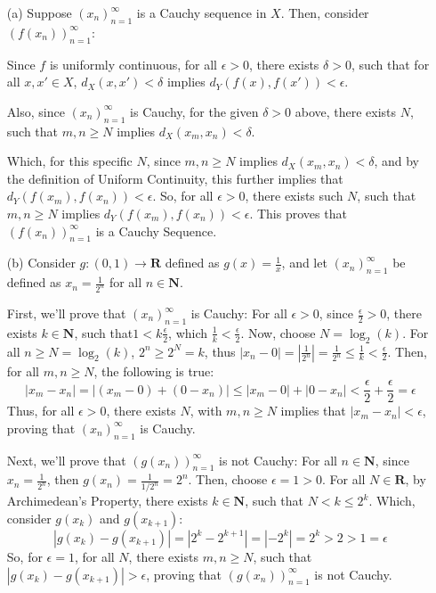 \documentclass{article}
\begin{document}
\begin{itemize}
    \item[(a)] Suppose $(x_n)_{n=1}^{\infty}$ is a Cauchy sequence in $X$. Then, consider $\left(f(x_n)\right)_{n=1}^{\infty}$: 
    
    Since $f$ is uniformly continuous, for all $\epsilon > 0$, there exists $\delta > 0$, such that for all $x,x' \in X$, $d_X(x,x') < \delta$ implies $d_Y(f(x),f(x')) < \epsilon$.

    Also, since $(x_n)_{n=1}^{\infty}$ is Cauchy, for the given $\delta > 0$ above, there exists $N$, such that $m,n \geq N$ implies $d_X(x_m, x_n) < \delta$.

    Which, for this specific $N$, since $m,n \geq N$ implies $d_X(x_m, x_n) < \delta$, and by the definition of Uniform Continuity, this further implies that $d_Y(f(x_m), f(x_n)) < \epsilon$. So, for all $\epsilon >0$, there exists such $N$, such that $m,n \geq N$ implies $d_Y(f(x_m), f(x_n)) < \epsilon$. This proves that $(f(x_n))_{n=1}^{\infty}$ is a Cauchy Sequence.

    \hfill

    \item[(b)] Consider $g:(0,1) \rightarrow \mathbf{R}$ defined as $g(x) = \frac{1}{x}$, and let $(x_n)_{n=1}^{\infty}$ be defined as $x_n = \frac{1}{2^n}$ for all $n \in \mathbf{N}$.

    First, we'll prove that $(x_n)_{n=1}^{\infty}$ is Cauchy: For all $\epsilon > 0$, since $\frac{\epsilon}{2} > 0$, there exists $k \in \mathbf{N}$, such that$ 1 < k\frac{\epsilon}{2}$, which $\frac{1}{k} < \frac{\epsilon}{2}$. Now, choose $N = \log_{2}(k)$. For all $n \geq N = \log_2(k)$, $2^n \geq 2^N = k$, thus $|x_n-0| = |\frac{1}{2^n}| = \frac{1}{2^n} \leq \frac{1}{k} < \frac{\epsilon}{2}$. Then, for all $m,n \geq N$, the following is true:
    $$|x_m-x_n| = |(x_m-0) + (0-x_n)| \leq |x_m-0| + |0-x_n| < \frac{\epsilon}{2} + \frac{\epsilon}{2} = \epsilon$$
    Thus, for all $\epsilon >0$, there exists $N$, with $m,n \geq N$ implies that $|x_m-x_n| < \epsilon$, proving that $(x_n)_{n=1}^{\infty}$ is Cauchy.

    Next, we'll prove that $(g(x_n))_{n=1}^{\infty}$ is not Cauchy: For all $n \in \mathbf{N}$, since $x_n = \frac{1}{2^n}$, then $g(x_n) = \frac{1}{1/2^n} = 2^n$. Then, choose $\epsilon = 1 > 0$. For all $N \in \mathbf{R}$, by Archimedean's Property, there exists $k\in\mathbf{N}$, such that $N<k \leq 2^k$. Which, consider $g(x_k)$ and $g(x_{k+1})$: 
    $$|g(x_k)-g(x_{k+1})| = |2^k-2^{k+1}| = |-2^k| = 2^k > 2 > 1 = \epsilon$$
    So, for $\epsilon =1$, for all $N$, there exists $m,n \geq N$, such that $|g(x_k)-g(x_{k+1})| > \epsilon$, proving that $(g(x_n))_{n=1}^{\infty}$ is not Cauchy.


\end{itemize}
\end{document}
